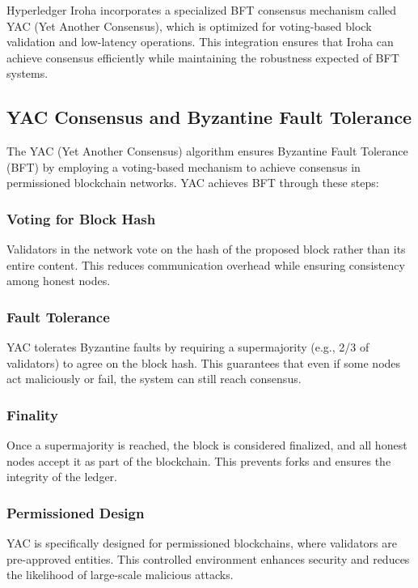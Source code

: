 \documentclass[final]{rc-book-2.14}
\begin{document}
Hyperledger Iroha incorporates a specialized BFT consensus mechanism called YAC (Yet Another Consensus)\cite{muratov_yac_2018}, which is optimized for voting-based block validation and low-latency operations. This integration ensures that Iroha can achieve consensus efficiently while maintaining the robustness expected of BFT systems.

\subsection{YAC Consensus and Byzantine Fault Tolerance}
The YAC (Yet Another Consensus) algorithm ensures Byzantine Fault Tolerance (BFT) \cite{muratov_yac_2018} by employing a voting-based mechanism to achieve consensus in permissioned blockchain networks. YAC achieves BFT through these steps:

\subsubsection{Voting for Block Hash}
Validators in the network vote on the hash of the proposed block rather than its entire content. This reduces communication overhead while ensuring consistency among honest nodes.

\subsubsection{Fault Tolerance}
YAC tolerates Byzantine faults by requiring a supermajority (e.g., 2/3 of validators) to agree on the block hash. This guarantees that even if some nodes act maliciously or fail, the system can still reach consensus.

\subsubsection{Finality}
Once a supermajority is reached, the block is considered finalized, and all honest nodes accept it as part of the blockchain. This prevents forks and ensures the integrity of the ledger.

\subsubsection{Permissioned Design}
YAC is specifically designed for permissioned blockchains, where validators are pre-approved entities. This controlled environment enhances security and reduces the likelihood of large-scale malicious attacks.
\end{document}
